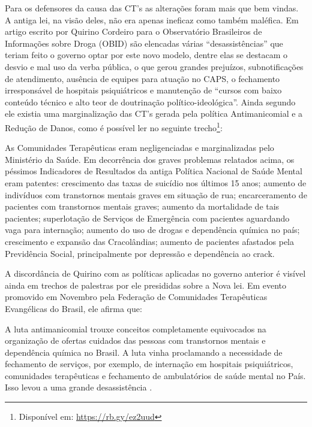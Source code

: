 \documentclass[
	12pt,				%
	oneside,			%
	a4paper,			%
	sumario=tradicional,
	english,			%
	brazil				%
	]{abntex2}
\begin{document}
Para os defensores da causa das CT's as alterações foram mais que bem vindas. A antiga lei, na visão deles, não era apenas ineficaz como também maléfica. Em artigo escrito por Quirino Cordeiro para o Observatório Brasileiros de Informações sobre Droga (\acrshort{OBID}) são elencadas várias ``desassistências'' que teriam feito o governo optar por este novo modelo, dentre elas se destacam o desvio e mal uso da verba pública, o que gerou grandes prejuízos, subnotificações de atendimento, ausência de equipes para atuação no \acrshort{CAPS}, o fechamento irresponsável de hospitais psiquiátricos e manutenção de ``cursos com baixo conteúdo técnico e alto teor de doutrinação político-ideológica''. Ainda segundo ele existia uma marginalização das CT's gerada pela política Antimanicomial e a Redução de Danos, como é possível ler no seguinte trecho\footnote{Disponível em: \url{https://rb.gy/ez2uud}}:
\begin{quoting}[rightmargin=0cm,leftmargin=4cm]
\begin{singlespace}
{\footnotesize
As Comunidades Terapêuticas eram negligenciadas e marginalizadas pelo Ministério da Saúde. Em decorrência dos graves problemas relatados acima, os péssimos Indicadores de Resultados da antiga Política Nacional de Saúde Mental eram patentes: crescimento das taxas de suicídio nos últimos 15 anos; aumento de indivíduos com transtornos mentais graves em situação de rua; encarceramento de pacientes com transtornos mentais graves; aumento da mortalidade de tais pacientes; superlotação de Serviços de Emergência com pacientes aguardando vaga para internação; aumento do uso de drogas e dependência química no país; crescimento e expansão das Cracolândias; aumento de pacientes afastados pela Previdência Social, principalmente por depressão e dependência ao crack.}
\end{singlespace}
\end{quoting}
A discordância de Quirino com as políticas aplicadas no governo anterior é visível ainda em trechos de palestras por ele presididas sobre a Nova lei. Em evento promovido em Novembro pela Federação de Comunidades Terapêuticas Evangélicas do Brasil, ele afirma que:
\begin{quoting}[rightmargin=0cm,leftmargin=4cm]
\begin{singlespace}
{\footnotesize
A luta antimanicomial trouxe conceitos completamente equivocados na organização de ofertas cuidados das pessoas com transtornos mentais e dependência química no Brasil. A luta vinha proclamando a necessidade de fechamento de serviços, por exemplo, de internação em hospitais psiquiátricos, comunidades terapêuticas e fechamento de ambulatórios de saúde mental no País. Isso levou a uma grande desassistência \cite{folha2019}.}
\end{singlespace}
\end{quoting}
\end{document}
